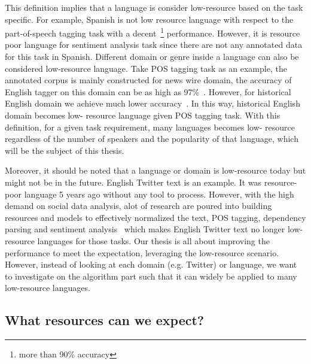\documentclass[12pt,twoside,final,hidelinks]{ltthesis}
\theoremstyle{definition}
\begin{document}
This definition implies that a language is consider low-resource based on the task 
specific. For example, Spanish is not low resource language with respect to 
the part-of-speech tagging task with a decent~\footnote{more than 90\% accuracy}
performance. However, it is resource poor language for sentiment analysis task 
since  there are not any annotated data for this task in Spanish. 
Different domain or genre inside a language can also be considered low-resource 
language. Take POS tagging task as an example, the annotated corpus is mainly 
constructed for news wire domain, the accuracy of English tagger on this domain 
can be as high as 97\%~\cite{Toutanova:2003}. However, for historical English 
domain we achieve much lower accuracy~\cite{yang-eisenstein:2016:N16-1}. In this way, historical English domain becomes low-
resource language given POS tagging task. 
With this definition, for a given task requirement, many languages becomes low-
resource regardless of the number of speakers and the popularity of that 
language, which will be the subject of this thesis.%

Moreover, it should be noted that a language or domain is low-resource today but might not be in the future. English Twitter text is an example. It was resource-poor language 5 years ago without any tool to process. However, with the high demand on social data analysis, alot of research are poured into  building resources and models to effectively normalized the text, POS tagging, dependency parsing and sentiment analysis~\cite{han-baldwin:2011:ACL-HLT2011,gimpel-EtAl:2011:ACL-HLT2011,kong-EtAl:2014:EMNLP2014,Agarwal:2011:SAT:2021109.2021114} which makes English Twitter text no longer low-resource languages for those tasks. Our thesis is all about improving the performance to meet the expectation, leveraging the low-resource scenario. However, instead of looking at each domain (e.g. Twitter) or language, we want to investigate on the algorithm part such that it can widely be applied to many low-resource languages.   

\subsection{What resources can we expect?}
\end{document}

